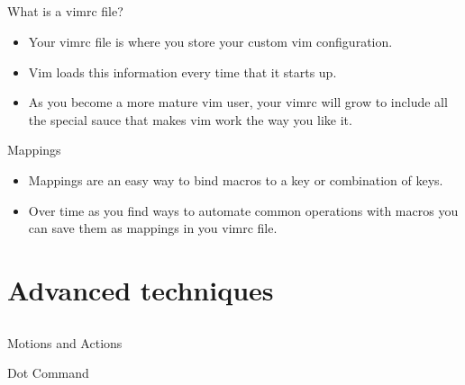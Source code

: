 \documentclass{beamer}
\begin{document}
    \subsection{}
    \begin{frame}{What is a vimrc file?}
        \begin{itemize}
            \item Your vimrc file is where you store your custom vim configuration.
            \item Vim loads this information every time that it starts up.
            \item As you become a more mature vim user, your vimrc will grow to include all the special sauce that makes vim work the way you like it.
        \end{itemize}
    \end{frame}
    \begin{frame}{Mappings}
        \begin{itemize}
            \item Mappings are an easy way to bind macros to a key or combination of keys.
            \item Over time as you find ways to automate common operations with macros you can save them as mappings in you vimrc file.
        \end{itemize}
    \end{frame}
    \section{Advanced techniques}
    \subsection{}
    \begin{frame}{Motions and Actions}
    \end{frame}
    \begin{frame}{Dot Command}
    \end{frame}
\end{document}
